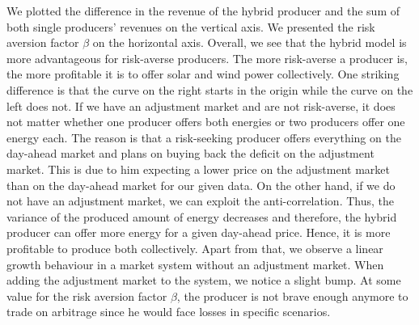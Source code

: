 We plotted the difference in the revenue of the hybrid producer and the sum of both single producers' revenues on the vertical axis. We presented the risk aversion factor $\beta$ on the horizontal axis. Overall, we see that the hybrid model is more advantageous for risk-averse producers. The more risk-averse a producer is, the more profitable it is to offer solar and wind power collectively. One striking difference is that the curve on the right starts in the origin while the curve on the left does not. If we have an adjustment market and are not risk-averse, it does not matter whether one producer offers both energies or two producers offer one energy each. The reason is that a risk-seeking producer offers everything on the day-ahead market and plans on buying back the deficit on the adjustment market. This is due to him expecting a lower price on the adjustment market than on the day-ahead market for our given data.
On the other hand, if we do not have an adjustment market, we can exploit the anti-correlation. Thus, the variance of the produced amount of energy decreases and therefore, the hybrid producer can offer more energy for a given day-ahead price. Hence, it is more profitable to produce both collectively. 
Apart from that, we observe a linear growth behaviour in a market system without an adjustment market. When adding the adjustment market to the system, we notice a slight bump. At some value for the risk aversion factor $\beta$, the producer is not brave enough anymore to trade on arbitrage since he would face losses in specific scenarios. 